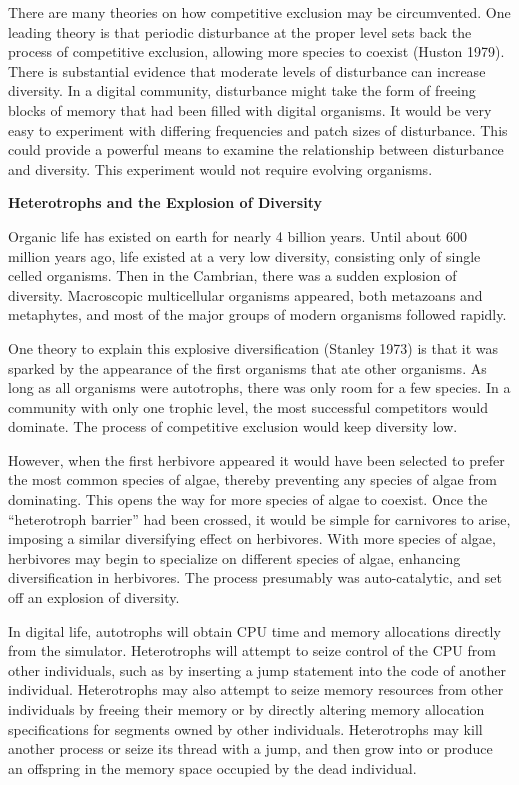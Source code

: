 There are many theories on how competitive exclusion may be circumvented.
One leading theory is that periodic disturbance at the proper level
sets back the process of competitive exclusion, allowing more species
to coexist (Huston 1979).  There is substantial evidence that moderate
levels of disturbance can increase diversity.  In a digital community,
disturbance might take the form of freeing blocks of memory that had
been filled with digital organisms.  It would be very easy to experiment
with differing frequencies and patch sizes of disturbance.  This could
provide a powerful means to examine the relationship between disturbance
and diversity.  This experiment would not require evolving organisms.

\LP
\bf Heterotrophs and the Explosion of Diversity\rm
\eLP

Organic life has existed on earth for nearly 4 billion years.  Until about
600 million years ago, life existed at a very low diversity,
consisting only of single celled organisms.  Then in the Cambrian, there
was a sudden explosion of diversity.  Macroscopic multicellular organisms
appeared, both metazoans and metaphytes, and most of the major groups of
modern organisms followed rapidly.

One theory to explain this explosive diversification (Stanley 1973) is
that it was sparked by the appearance of the first
organisms that ate other organisms.  As long as all organisms were
autotrophs, there was only room for a few species.  In a community with
only one trophic level, the most successful competitors would dominate.
The process of competitive exclusion would keep diversity low.

However, when the first herbivore appeared it would have been selected
to prefer the most common species of algae, thereby preventing any
species of algae from dominating.  This opens the way for more species
of algae to coexist.  Once the ``heterotroph barrier'' had been crossed,
it would be simple for carnivores to arise, imposing a similar
diversifying effect on herbivores.  With more species of algae,
herbivores may begin to specialize on different species of algae,
enhancing diversification in herbivores.  The process presumably was
auto-catalytic, and set off an explosion of diversity.

In digital life, autotrophs will obtain CPU time and memory allocations
directly from the simulator.  Heterotrophs will attempt to seize control
of the CPU from other individuals, such as by inserting a jump statement
into the code of another individual.  Heterotrophs may also attempt to
seize memory resources from other individuals by freeing their memory
or by directly altering memory allocation specifications for segments
owned by other individuals.  Heterotrophs may kill another process
or seize its thread with a jump, and then grow into or produce an
offspring in the memory space occupied by the dead individual.

